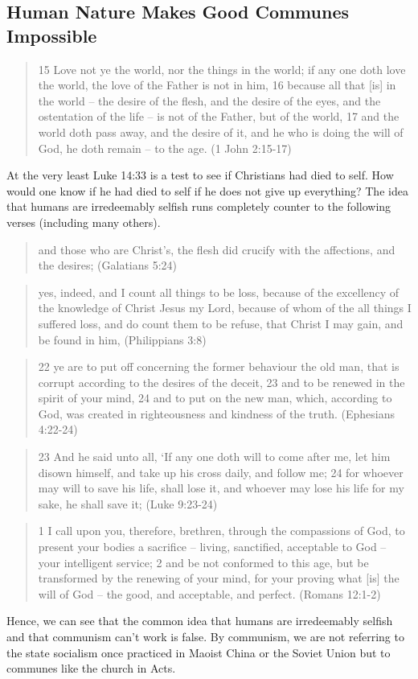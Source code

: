 \documentclass[11pt]{article}
\begin{document}
\subsection{Human Nature Makes Good Communes Impossible}
\begin{quote}
15 Love not ye the world, nor the things in the world; if any one doth love the world, the love of the Father is not in him,
16 because all that [is] in the world -- the desire of the flesh, and the desire of the eyes, and the ostentation of the life -- is not of the Father, but of the world, 17 and the world doth pass away, and the desire of it, and he who is doing the will of God, he doth remain -- to the age. (1 John 2:15-17)
\end{quote}
At the very least Luke 14:33 is a test to see if Christians had died to self. How would one know if he had died to self if he does not give up everything? The idea that humans are irredeemably selfish runs completely counter to the following verses (including many others).\cite{death to self verses}
\begin{quote}
and those who are Christ's, the flesh did crucify with the affections, and the desires; (Galatians 5:24)
\end{quote}
\begin{quote}
yes, indeed, and I count all things to be loss, because of the excellency of the knowledge of Christ Jesus my Lord, because of whom of the all things I suffered loss, and do count them to be refuse, that Christ I may gain, and be found in him, (Philippians 3:8)
\end{quote}
\begin{quote}
22 ye are to put off concerning the former behaviour the old man, that is corrupt according to the desires of the deceit, 23 and to be renewed in the spirit of your mind, 24 and to put on the new man, which, according to God, was created in righteousness and kindness of the truth. (Ephesians 4:22-24)  
\end{quote}
\begin{quote}
23 And he said unto all, `If any one doth will to come after me, let him disown himself, and take up his cross daily, and follow me; 24 for whoever may will to save his life, shall lose it, and whoever may lose his life for my sake, he shall save it; (Luke 9:23-24)
\end{quote}
\begin{quote}
1 I call upon you, therefore, brethren, through the compassions of God, to present your bodies a sacrifice -- living, sanctified, acceptable to God -- your intelligent service; 2 and be not conformed to this age, but be transformed by the renewing of your mind, for your proving what [is] the will of God -- the good, and acceptable, and perfect. (Romans 12:1-2)
 \end{quote} 
Hence, we can see that the common idea that humans are irredeemably selfish and that communism can't work is false. By communism, we are not referring to the state socialism once practiced in Maoist China or the Soviet Union but to communes like the church in Acts.
\end{document}
